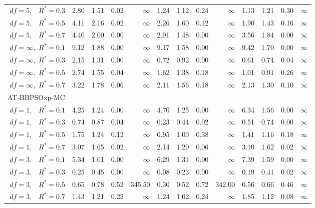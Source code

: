 \documentclass[cmbright]{staauth}
\begin{document}
\begin{table}[ht]
{\begin{tabular}{r|rrrr|rrrr|rrrr}
  $df = 5,\enspace$ $R^* =0.3$ & 2.80 & 1.51 & 0.02 & $\infty$ & 1.24 & 1.12 & 0.24 & $\infty$ & 1.13 & 1.21 & 0.30 & $\infty$ \\
  $df = 5,\enspace$ $R^* =0.5$ & 4.11 & 2.16 & 0.02 & $\infty$ & 2.26 & 1.60 & 0.12 & $\infty$ & 1.90 & 1.43 & 0.16 & $\infty$ \\
  $df = 5,\enspace$ $R^* =0.7$ & 4.40 & 2.00 & 0.00 & $\infty$ & 2.91 & 1.48 & 0.00 & $\infty$ & 3.56 & 1.84 & 0.00 & $\infty$ \\
  $df = \infty,$ $R^* =0.1$ & 9.12 & 1.88 & 0.00 & $\infty$ & 9.17 & 1.58 & 0.00 & $\infty$ & 9.42 & 1.70 & 0.00 & $\infty$ \\
  $df = \infty,$ $R^* =0.3$ & 2.15 & 1.31 & 0.00 & $\infty$ & 0.72 & 0.92 & 0.00 & $\infty$ & 0.61 & 0.74 & 0.04 & $\infty$ \\
  $df = \infty,$ $R^* =0.5$ & 2.74 & 1.55 & 0.04 & $\infty$ & 1.62 & 1.38 & 0.18 & $\infty$ & 1.01 & 0.91 & 0.26 & $\infty$ \\
  $df = \infty,$ $R^* =0.7$ & 3.22 & 1.78 & 0.06 & $\infty$ & 2.11 & 1.56 & 0.18 & $\infty$ & 2.13 & 1.30 & 0.10 & $\infty$ \\
\hline
\multicolumn{1}{l|}{AT-BBPSOxp-MC} &&&&&&&&&&&&\\
  $df = 1,\enspace$ $R^* =0.1$ & 4.25 & 1.24 & 0.00 & $\infty$ & 4.70 & 1.25 & 0.00 & $\infty$ & 6.34 & 1.56 & 0.00 & $\infty$ \\
  $df = 1,\enspace$ $R^* =0.3$ & 0.74 & 0.87 & 0.04 & $\infty$ & 0.23 & 0.44 & 0.02 & $\infty$ & 0.51 & 0.74 & 0.00 & $\infty$ \\
  $df = 1,\enspace$ $R^* =0.5$ & 1.75 & 1.24 & 0.12 & $\infty$ & 0.95 & 1.00 & 0.38 & $\infty$ & 1.41 & 1.16 & 0.18 & $\infty$ \\
  $df = 1,\enspace$ $R^* =0.7$ & 3.07 & 1.65 & 0.02 & $\infty$ & 2.14 & 1.20 & 0.06 & $\infty$ & 3.10 & 1.62 & 0.02 & $\infty$ \\
  $df = 3,\enspace$ $R^* =0.1$ & 5.34 & 1.01 & 0.00 & $\infty$ & 6.29 & 1.31 & 0.00 & $\infty$ & 7.39 & 1.59 & 0.00 & $\infty$ \\
  $df = 3,\enspace$ $R^* =0.3$ & 0.25 & 0.45 & 0.00 & $\infty$ & 0.08 & 0.23 & 0.00 & $\infty$ & 0.19 & 0.41 & 0.02 & $\infty$ \\
  $df = 3,\enspace$ $R^* =0.5$ & 0.65 & 0.78 & 0.52 & 345.50 & 0.30 & 0.52 & 0.72 & 342.00 & 0.56 & 0.66 & 0.46 & $\infty$ \\
  $df = 3,\enspace$ $R^* =0.7$ & 1.43 & 1.21 & 0.22 & $\infty$ & 1.24 & 1.02 & 0.24 & $\infty$ & 1.85 & 1.12 & 0.08 & $\infty$ \\

\end{tabular}}
\end{table}
\end{document}
